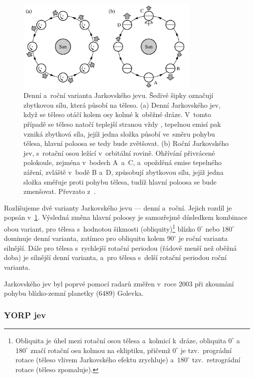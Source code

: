 \documentclass[A4paper, 12pt, oneside, openany]{book}
\begin{document}
\begin{figure} 
	\centering

		\includegraphics[width=0.8\textwidth]{obr/jarkovskeho_jev.png}
	\caption{Denní a~roční varianta Jarkovského jevu. Šedivé šipky
	označují zbytkovou sílu, která působí na těleso. (a) Denní Jarkovského jev, když se těleso otáčí kolem osy kolmé k~oběžné dráze. V~tomto případě se těleso natočí teplejší stranou vždy , tepelnou emisí pak vzniká zbytková síla, jejíž jedna složka působí ve~směru pohybu tělesa, hlavní poloosa se tedy bude zvětšovat. (b) Roční Jarkovského jev, s~rotační osou ležící v~orbitální rovině. Ohřívání přivrácené polokoule, zejména v~bodech A~a~C, a~opožděná emise tepelného záření, zvláště v~bodě B a~D, způsobují zbytkovou sílu, jejíž jedna složka směřuje proti pohybu tělesa, tudíž hlavní poloosa se bude zmenšovat. Převzato z~\cite{fmt}.} \label{fig:jarko}
\end{figure}

Rozlišujeme dvě varianty Jarkovského jevu --- denní a~roční. Jejich rozdíl je popsán v~\ref{fig:jarko}. Výsledná změna hlavní poloosy je samozřejmě důsledkem kombinace obou variant, pro tělesa s~hodnotou šikmosti (obliquity)\footnote{Obliquita je úhel mezi rotační osou tělesa a~kolmicí k~dráze, obliquita $0^\circ$ a~$180^\circ$ značí rotační osu kolmou na ekliptiku, přičemž $0^\circ$ je tzv.\ prográdní rotace (těleso vlivem Jarkovského efektu zrychluje) a~$180^\circ$ tzv.\ retrográdní rotace (těleso zpomaluje).} blízko $0^\circ$ nebo $180^\circ$ dominuje denní varianta, zatímco pro obliquitu kolem $90^\circ$ je roční varianta silnější. Dále pro tělesa s~rychlejší rotační periodou (řádově menší než oběžná doba) je silnější denní varianta, a~pro tělesa s~delší rotační periodou roční varianta. 

Jarkovského jev byl poprvé pomocí radarů změřen v~roce 2003 při zkoumání pohybu blízko-zemní planetky (6489) Golevka.~\cite{chesley03}
\subsubsection{YORP jev}
\end{document}
